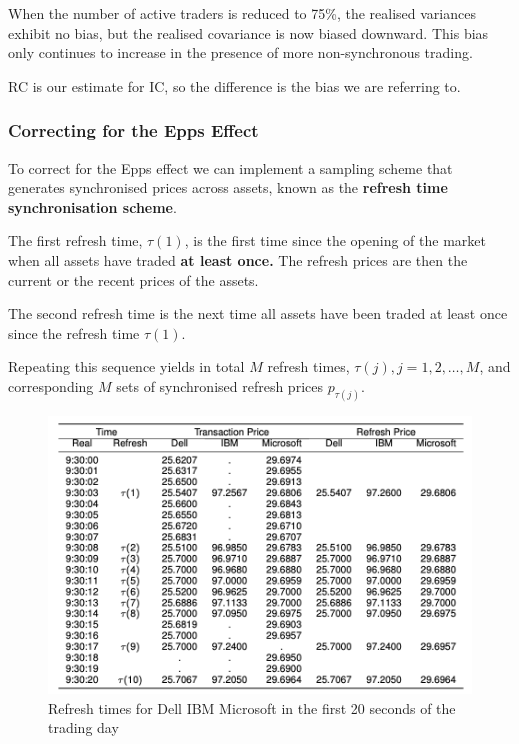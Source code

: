 \documentclass[11pt]{article}
\begin{document}
When the number of active traders is reduced to 75\%, the realised variances exhibit no bias, but the realised covariance is now biased downward. This bias only continues to increase in the presence of more non-synchronous trading.
\begin{note}
    RC is our estimate for IC, so the difference is the bias we are referring to.
\end{note}

\subsubsection{Correcting for the Epps Effect}

To correct for the Epps effect we can implement a sampling scheme that generates synchronised prices across assets, known as the \textbf{refresh time synchronisation scheme}.

\begin{procedure}
    The first refresh time, $\tau(1)$, is the first time since the opening of the market when all assets have traded \textbf{at least once.} The refresh prices are then the current or the recent prices of the assets.

    The second refresh time is the next time all assets have been traded at least once since the refresh time $\tau(1)$.

    Repeating this sequence yields in total $M$ refresh times, $\tau(j), j = 1,2, \ldots, M$, and corresponding $M$ sets of synchronised refresh prices $p_{\tau(j)}$.
\end{procedure}

\begin{figure}[h]
    \centering
    \includegraphics[width=12cm]{pics/refresh times.png}
    \caption{Refresh times for Dell IBM Microsoft in the first 20 seconds of the trading day}
    \label{fig:refresh times}
\end{figure}
\end{document}
